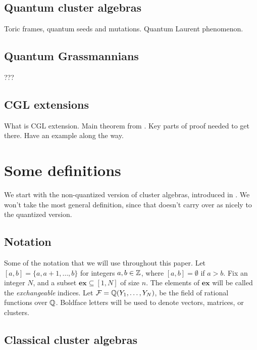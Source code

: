 \documentclass{article}
\newcommand{\ex}{\mathbf{ex}}
\begin{document}
\subsection{Quantum cluster algebras}

Toric frames, quantum seeds and mutations. Quantum Laurent phenomenon.

\subsection{Quantum Grassmannians}
???

\subsection{CGL extensions}

What is CGL extension. Main theorem from \cite{GoodearlYakimov2017QCA}. Key parts of
proof needed to get there. Have an example along the way.

\section{Some definitions}

We start with the non-quantized version of cluster algebras, introduced in
\cite{FominZelivinsky2002CAF}. We won't take the most general definition, since that
doesn't carry over as nicely to the quantized version.

\subsection{Notation}

Some of the notation that we will use throughout this paper. Let $[a,b] = \{a, a+1,
	\dots, b\}$ for integers $a,b \in \mathbb{Z}$, where $[a,b] = \emptyset$ if $a > b$. Fix an
integer $N$, and a subset $\ex \subseteq [1, N]$ of size $n$. The elements of $\ex$
will be called the \emph{exchangeable} indices. Let $\mathcal{F} = \mathbb{Q}(Y_1, \dots, Y_N)$, be
the field of rational functions over $\mathbb{Q}$. Boldface letters will be used to denote
vectors, matrices, or clusters.

\subsection{Classical cluster algebras}
\end{document}
